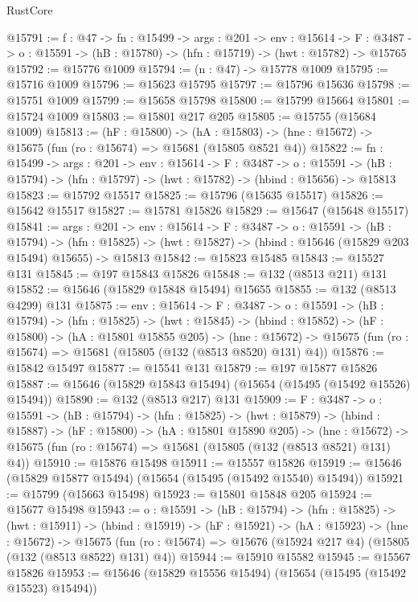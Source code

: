 \begin{lexlean}{RustCore}
\begin{coremodule}
@15791 := {f : @47} ->
  {fn : @15499} ->
  {args : @201} ->
  {env : @15614} ->
  {F : @3487} -> {o : @15591} -> (hB : @15780) -> (hfn : @15719) -> (hwt : @15782) -> @15765
@15792 := @15776 @1009
@15794 := (n : @47) -> @15778 @1009
@15795 := @15716 @1009
@15796 := @15623 @15795
@15797 := @15796 @15636
@15798 := @15751 @1009
@15799 := @15658 @15798
@15800 := @15799 @15664
@15801 := @15724 @1009
@15803 := @15801 @217 @205
@15805 := @15755 (@15684 @1009)
@15813 := (hF : @15800) ->
  (hA : @15803) -> (hne : @15672) -> @15675 (fun (ro : @15674) => @15681 (@15805 @8521 @4))
@15822 := {fn : @15499} ->
  {args : @201} ->
  {env : @15614} ->
  {F : @3487} ->
  {o : @15591} -> (hB : @15794) -> (hfn : @15797) -> (hwt : @15782) -> (hbind : @15656) -> @15813
@15823 := @15792 @15517
@15825 := @15796 (@15635 @15517)
@15826 := @15642 @15517
@15827 := @15781 @15826
@15829 := @15647 (@15648 @15517)
@15841 := {args : @201} ->
  {env : @15614} ->
  {F : @3487} ->
  {o : @15591} ->
  (hB : @15794) ->
  (hfn : @15825) -> (hwt : @15827) -> (hbind : @15646 (@15829 @203 @15494) @15655) -> @15813
@15842 := @15823 @15485
@15843 := @15527 @131
@15845 := @197 @15843 @15826
@15848 := @132 (@8513 @211) @131
@15852 := @15646 (@15829 @15848 @15494) @15655
@15855 := @132 (@8513 @4299) @131
@15875 := {env : @15614} ->
  {F : @3487} ->
  {o : @15591} ->
  (hB : @15794) ->
  (hfn : @15825) ->
  (hwt : @15845) ->
  (hbind : @15852) ->
  (hF : @15800) ->
  (hA : @15801 @15855 @205) ->
  (hne : @15672) -> @15675 (fun (ro : @15674) => @15681 (@15805 (@132 (@8513 @8520) @131) @4))
@15876 := @15842 @15497
@15877 := @15541 @131
@15879 := @197 @15877 @15826
@15887 := @15646 (@15829 @15843 @15494) (@15654 (@15495 (@15492 @15526) @15494))
@15890 := @132 (@8513 @217) @131
@15909 := {F : @3487} ->
  {o : @15591} ->
  (hB : @15794) ->
  (hfn : @15825) ->
  (hwt : @15879) ->
  (hbind : @15887) ->
  (hF : @15800) ->
  (hA : @15801 @15890 @205) ->
  (hne : @15672) -> @15675 (fun (ro : @15674) => @15681 (@15805 (@132 (@8513 @8521) @131) @4))
@15910 := @15876 @15498
@15911 := @15557 @15826
@15919 := @15646 (@15829 @15877 @15494) (@15654 (@15495 (@15492 @15540) @15494))
@15921 := @15799 (@15663 @15498)
@15923 := @15801 @15848 @205
@15924 := @15677 @15498
@15943 := {o : @15591} ->
  (hB : @15794) ->
  (hfn : @15825) ->
  (hwt : @15911) ->
  (hbind : @15919) ->
  (hF : @15921) ->
  (hA : @15923) ->
  (hne : @15672) ->
  @15675 (fun (ro : @15674) => @15676 (@15924 @217 @4) (@15805 (@132 (@8513 @8522) @131) @4))
@15944 := @15910 @15582
@15945 := @15567 @15826
@15953 := @15646 (@15829 @15556 @15494) (@15654 (@15495 (@15492 @15523) @15494))

\end{coremodule}
\end{lexlean}
